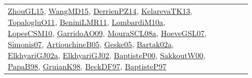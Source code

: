 {\begin{longtable}{lp{3cm}>{\raggedright}p{6cm}>{\raggedright}p{6cm}p{8cm}}
\href{papers/ZhouGL15.pdf}{ZhouGL15}\cite{ZhouGL15}, \href{articles/WangMD15.pdf}{WangMD15}\cite{WangMD15}, \href{papers/DerrienPZ14.pdf}{DerrienPZ14}\cite{DerrienPZ14}, \href{papers/KelarevaTK13.pdf}{KelarevaTK13}\cite{KelarevaTK13}, \href{articles/TopalogluO11.pdf}{TopalogluO11}\cite{TopalogluO11}, \href{articles/BeniniLMR11.pdf}{BeniniLMR11}\cite{BeniniLMR11}, \href{articles/LombardiM10a.pdf}{LombardiM10a}\cite{LombardiM10a}, \href{articles/LopesCSM10.pdf}{LopesCSM10}\cite{LopesCSM10}, \href{articles/GarridoAO09.pdf}{GarridoAO09}\cite{GarridoAO09}, \href{papers/MouraSCL08a.pdf}{MouraSCL08a}\cite{MouraSCL08a}, \href{papers/HoeveGSL07.pdf}{HoeveGSL07}\cite{HoeveGSL07}, \href{articles/Simonis07.pdf}{Simonis07}\cite{Simonis07}, \href{papers/ArtiouchineB05.pdf}{ArtiouchineB05}\cite{ArtiouchineB05}, \href{papers/Geske05.pdf}{Geske05}\cite{Geske05}, \href{papers/Bartak02a.pdf}{Bartak02a}\cite{Bartak02a}, \href{papers/ElkhyariGJ02a.pdf}{ElkhyariGJ02a}\cite{ElkhyariGJ02a}, \href{papers/ElkhyariGJ02.pdf}{ElkhyariGJ02}\cite{ElkhyariGJ02}, \href{articles/BaptisteP00.pdf}{BaptisteP00}\cite{BaptisteP00}, \href{articles/SakkoutW00.pdf}{SakkoutW00}\cite{SakkoutW00}, \href{articles/PapaB98.pdf}{PapaB98}\cite{PapaB98}, \href{papers/GruianK98.pdf}{GruianK98}\cite{GruianK98}, \href{papers/BeckDF97.pdf}{BeckDF97}\cite{BeckDF97}, \href{papers/BaptisteP97.pdf}{BaptisteP97}\cite{BaptisteP97}\\

\end{longtable}}
